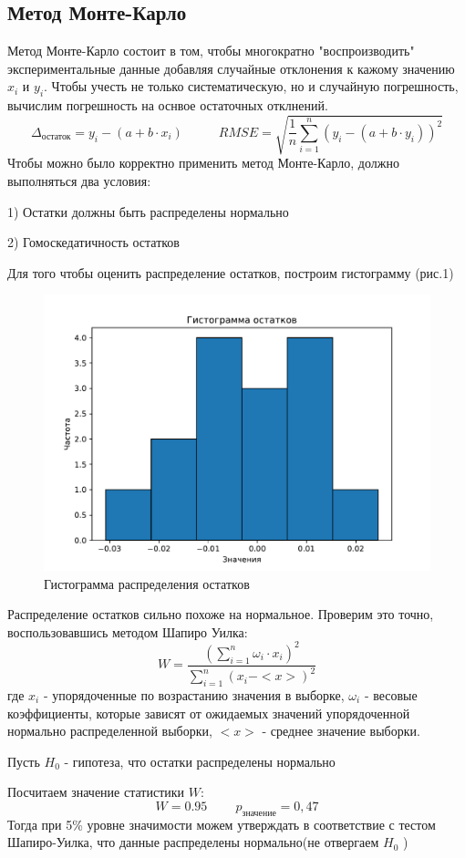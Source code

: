 \documentclass[a4paper,20pt]{article}
\theoremstyle{definition}
\begin{document}
\subsection{Метод Монте-Карло}
Метод Монте-Карло состоит в том, чтобы многократно "воспроизводить" экспериментальные данные добавляя случайные отклонения к кажому значению $x_i$ и $y_i$. Чтобы учесть не только 
систематическую, но и случайную погрешность, вычислим погрешность на оснвое остаточных отклнений.
\begin{equation}
	\Delta_{\text{остаток}} = y_i - (a + b \cdot x_i) \;\;\;\;\;\;\;\;\;\; RMSE = \sqrt{\frac{1}{n}\sum_{i=1}^{n}(y_i - (a + b\cdot y_i))^2}
\end{equation}
Чтобы можно было корректно применить метод Монте-Карло, должно выполняться два условия: \par
1) Остатки должны быть распределены нормально\par
2) Гомоскедатичность остатков \par
Для того чтобы оценить распределение остатков, построим гистограмму (рис.1)
\begin{figure}[h!]
    \centering
    \includegraphics[width=0.7\linewidth]{gist.pdf}
    \caption{Гистограмма распределения остатков}    
\end{figure}
Распределение остатков сильно похоже на нормальное. Проверим это точно, воспользовавшись методом Шапиро Уилка:
\begin{equation}
	W = \frac{(\sum_{i=1}^{n}\omega_i \cdot x_i)^2}{\sum_{i=1}^{n}(x_i - <x>)^2}
\end{equation}
где $x_i$ - упорядоченные по возрастанию значения в выборке, $\omega_i$ -  весовые коэффициенты, которые зависят от ожидаемых значений упорядоченной нормально распределенной выборки,
 $<x>$ - среднее значение выборки. \par
 Пусть $H_0$ - гипотеза, что остатки распределены нормально \par
 Посчитаем значение статистики $W$:
 \begin{equation}
	W = 0.95 \;\;\;\;\;\;\;\; p_{\text{значение}} = 0,47
 \end{equation}
 Тогда при 5\% уровне значимости можем утверждать в соответствие с тестом Шапиро-Уилка, что данные распределены нормально(не отвергаем $H_0$ )
\end{document}
